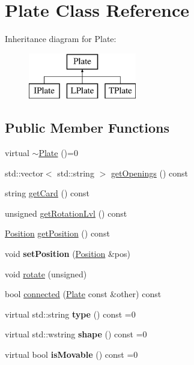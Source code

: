 \hypertarget{class_plate}{}\section{Plate Class Reference}
\label{class_plate}
Inheritance diagram for Plate\+:\begin{figure}[H]
\begin{center}
\leavevmode
\includegraphics[height=2.000000cm]{class_plate}
\end{center}
\end{figure}
\subsection*{Public Member Functions}
\begin{DoxyCompactItemize}
\item 
virtual \mbox{\hyperlink{class_plate_a07e82e84811b82030f8497f340b6b92e}{$\sim$\+Plate}} ()=0
\item 
std\+::vector$<$ std\+::string $>$ \mbox{\hyperlink{class_plate_a05230b33562e66bd87d530eb4915c415}{get\+Openings}} () const
\item 
string \mbox{\hyperlink{class_plate_afe793f974b124b90ee799f92de166eac}{get\+Card}} () const
\item 
unsigned \mbox{\hyperlink{class_plate_af9021c86bc00272cc47686924f832055}{get\+Rotation\+Lvl}} () const
\item 
\mbox{\hyperlink{class_position}{Position}} \mbox{\hyperlink{class_plate_aecd71bf092f486179d02605fa2c7771e}{get\+Position}} () const
\item 
\mbox{\label{class_plate_a145929c834124acc60d865b5fb2cc5ee}} 
void {\bfseries set\+Position} (\mbox{\hyperlink{class_position}{Position}} \&pos)
\item 
void \mbox{\hyperlink{class_plate_ae1b0689ce319dcc4fc2e9466f898947f}{rotate}} (unsigned)
\item 
bool \mbox{\hyperlink{class_plate_a2a0f4f57590ffec3305617072bb9dd33}{connected}} (\mbox{\hyperlink{class_plate}{Plate}} const \&other) const
\item 
\mbox{\label{class_plate_a68aa560ce45c5d88d33bb4280244c914}} 
virtual std\+::string {\bfseries type} () const =0
\item 
\mbox{\label{class_plate_a21f9eaef751f4c0009dd9532a9115891}} 
virtual std\+::wstring {\bfseries shape} () const =0
\item 
\mbox{\label{class_plate_a2a00c2573b936288e48af9a25bb88178}} 
virtual bool {\bfseries is\+Movable} () const =0
\end{DoxyCompactItemize}
